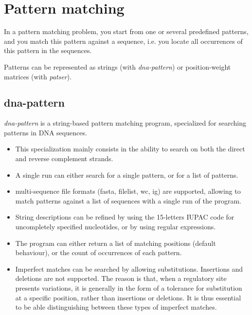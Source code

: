 \section{Pattern matching}

In a pattern matching problem, you start from one or several
predefined patterns, and you match this pattern against a sequence,
i.e. you locate all occurrences of this pattern in the sequences.

Patterns can be represented as strings (with \textit{dna-pattern}) or
position-weight matrices (with \textit{patser}). 

\subsection{dna-pattern}

\textit{dna-pattern} is a string-based pattern matching program,
specialized for searching patterns in DNA sequences. 

\begin{itemize}

\item 
This specialization mainly consists in the ability to search on both
the direct and reverse complement strands.

\item 
A single run can either search for a single pattern, or for a list
of patterns.

\item 
multi-sequence file formats (fasta, filelist, wc, ig) are supported,
allowing to match patterns against a list of sequences with a single
run of the program.

\item 
String descriptions can be refined by using the 15-letters IUPAC code
for uncompletely specified nucleotides, or by using regular
expressions.

\item 
The program can either return a list of matching positions (default
behaviour), or the count of occurrences of each pattern.

\item 
Imperfect matches can be searched by allowing
substitutions. Insertions and deletions are not supported.  The reason
is that, when a regulatory site presents variations, it is generally
in the form of a tolerance for substitution at a specific position,
rather than insertions or deletions. It is thus essential to be able
distinguishing between these types of imperfect matches.

\end{itemize}


